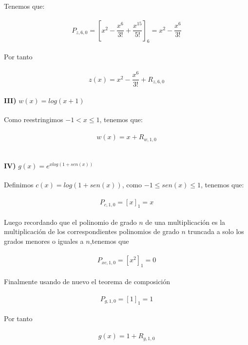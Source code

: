 \documentclass[11pt,letterpaper]{article}
\begin{document}
\,\\
Tenemos que:\,\\
\,\\
\begin{equation*}
    P_{z,6,0}=\left[x^2-\frac{x^6}{3!}+\frac{x^{15}}{5!}\right]_{6}=x^2-\frac{x^6}{3!}
\end{equation*}\,\\
Por tanto\,\\
\,\\
\begin{equation*}
    z(x)=x^2-\frac{x^6}{3!}+R_{z,6,0}
\end{equation*}\,\\
\textbf{III)}\,\,$w(x)=log(x+1)$\,\\
\,\\
Como reestringimos $-1<x\leq 1$, tenemos que:\,\\
\,\\
\begin{equation*}
    w(x)=x+R_{w,1,0}
\end{equation*}\,\\
\,\\
\textbf{IV)}\,\,$g(x)=e^{xlog(1+sen(x))}$\,\\
\,\\
Definimos $c(x)=log(1+sen(x))$, como $-1\leq sen(x)\leq1$, tenemos que:\,\\
\,\\
\begin{equation*}
    P_{c,1,0}=[x]_{1}=x
\end{equation*}\,\\
Luego recordando que el polinomio de grado $n$ de una multiplicaci\'on es la multiplicaci\'on
de los correspondientes polinomios de grado $n$ truncada a solo los grados menores o iguales a $n$,tenemos que
\,\\
\,\\
\begin{equation*}
    P_{xc,1,0}=[x^2]_{1}=0
\end{equation*}\,\\
Finalmente usando de nuevo el teorema de composici\'on\,\\
\,\\
\begin{equation*}
    P_{g,1,0}=[1]_{1}=1
\end{equation*}\,\\
Por tanto\,\\
\,\\
\begin{equation*}
    g(x)=1+R_{g,1,0}
\end{equation*}\,\\
\end{document}

